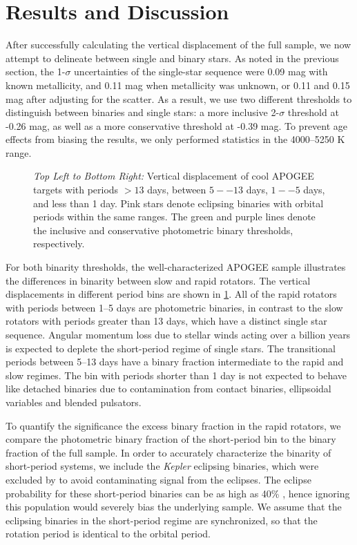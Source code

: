 \documentclass[manuscript]{aastex6}
\newcommand{\Kepler}{\mbox{\textit{Kepler}}}
\begin{document}
\section{Results and Discussion}
\label{sec:results}

After successfully calculating the vertical displacement of the full sample, we
now attempt to delineate between single and binary stars. As noted in the
previous section, the 1-\(\sigma\) uncertainties of the single-star sequence were 0.09 mag with 
known metallicity, and 0.11 mag when metallicity was unknown, or 0.11 and 0.15
mag after adjusting for the scatter. As a result, we use two
different thresholds to distinguish between binaries and single stars: a more
inclusive 2-\(\sigma\) threshold at -0.26 mag, as well as a more
conservative threshold at -0.39 mag. To prevent age effects from 
biasing the results, we only performed statistics in the 4000--5250 K 
range.

\begin{figure}[htb]
    \centering
    \caption{\emph{Top Left to Bottom Right:} Vertical displacement of cool 
        APOGEE targets with \citet{McQuillan14} periods \(> 13\) days, between 
        \(5--13\) days, \(1--5\) days, and less than 1 day. Pink stars denote 
        eclipsing binaries with orbital periods within the same ranges. The 
        green and purple lines denote the inclusive and conservative 
        photometric binary thresholds, 
    respectively.}\label{fig:apogee_rapid_excess}
\end{figure}

For both binarity thresholds, the well-characterized APOGEE sample 
illustrates the differences in binarity between slow and rapid rotators. The
vertical displacements in different period bins are shown in
\cref{fig:apogee_rapid_excess}. All of the rapid rotators with periods between
1--5 days are photometric binaries, in contrast to the slow rotators
with periods greater than 13 days, which have a distinct single star sequence. 
Angular momentum loss due to stellar winds acting over a billion years is
expected to deplete the short-period regime of single stars. The transitional 
periods between 5--13 days have a binary fraction intermediate to the 
rapid and slow regimes. The bin with periods shorter than 1 day is not expected
to behave like detached binaries due to contamination from contact binaries,
ellipsoidal variables and blended pulsators. 

To quantify the significance the excess binary fraction in the rapid rotators, 
we compare the photometric binary fraction of the short-period bin to the
binary fraction of the full sample. In order to accurately characterize the 
binarity of short-period systems, we include the \Kepler{} eclipsing binaries, 
which were excluded by \citet{McQuillan14} to avoid contaminating signal from the eclipses. The 
eclipse probability for these short-period binaries can be as high as 40\% 
\citep{Kirk16}, hence ignoring this population would severely
bias the underlying sample. We assume that the eclipsing binaries in the
short-period regime are synchronized, so that the rotation period is identical 
to the orbital period. 
\end{document}
